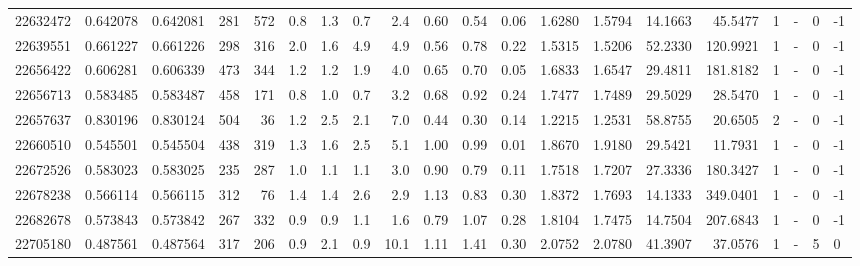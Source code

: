 \begin{tabular}{rrrrrrrrrrrrrrrrrlrl}
  22632472 & 0.642078 &   0.642081 &  281 &  572 &      0.8 &      1.3 &     0.7 &      2.4 &       0.60 &        0.54 &        0.06 &  1.6280 &  1.5794 &   14.1663 &   45.5477 &       1 &             - &        0 &        -1 \\
  22639551 & 0.661227 &   0.661226 &  298 &  316 &      2.0 &      1.6 &     4.9 &      4.9 &       0.56 &        0.78 &        0.22 &  1.5315 &  1.5206 &   52.2330 &  120.9921 &       1 &             - &        0 &        -1 \\
  22656422 & 0.606281 &   0.606339 &  473 &  344 &      1.2 &      1.2 &     1.9 &      4.0 &       0.65 &        0.70 &        0.05 &  1.6833 &  1.6547 &   29.4811 &  181.8182 &       1 &             - &        0 &        -1 \\
  22656713 & 0.583485 &   0.583487 &  458 &  171 &      0.8 &      1.0 &     0.7 &      3.2 &       0.68 &        0.92 &        0.24 &  1.7477 &  1.7489 &   29.5029 &   28.5470 &       1 &             - &        0 &        -1 \\
  22657637 & 0.830196 &   0.830124 &  504 &   36 &      1.2 &      2.5 &     2.1 &      7.0 &       0.44 &        0.30 &        0.14 &  1.2215 &  1.2531 &   58.8755 &   20.6505 &       2 &             - &        0 &        -1 \\
  22660510 & 0.545501 &   0.545504 &  438 &  319 &      1.3 &      1.6 &     2.5 &      5.1 &       1.00 &        0.99 &        0.01 &  1.8670 &  1.9180 &   29.5421 &   11.7931 &       1 &             - &        0 &        -1 \\
  22672526 & 0.583023 &   0.583025 &  235 &  287 &      1.0 &      1.1 &     1.1 &      3.0 &       0.90 &        0.79 &        0.11 &  1.7518 &  1.7207 &   27.3336 &  180.3427 &       1 &             - &        0 &        -1 \\
  22678238 & 0.566114 &   0.566115 &  312 &   76 &      1.4 &      1.4 &     2.6 &      2.9 &       1.13 &        0.83 &        0.30 &  1.8372 &  1.7693 &   14.1333 &  349.0401 &       1 &             - &        0 &        -1 \\
  22682678 & 0.573843 &   0.573842 &  267 &  332 &      0.9 &      0.9 &     1.1 &      1.6 &       0.79 &        1.07 &        0.28 &  1.8104 &  1.7475 &   14.7504 &  207.6843 &       1 &             - &        0 &        -1 \\
  22705180 & 0.487561 &   0.487564 &  317 &  206 &      0.9 &      2.1 &     0.9 &     10.1 &       1.11 &        1.41 &        0.30 &  2.0752 &  2.0780 &   41.3907 &   37.0576 &       1 &             - &        5 &         0 \\

\end{tabular}
